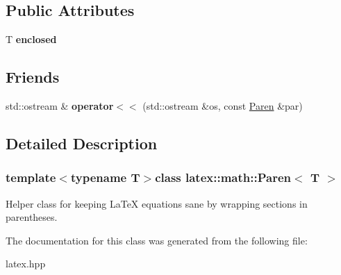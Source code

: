 \subsection*{\-Public \-Attributes}
\begin{DoxyCompactItemize}
\item 
\hypertarget{classlatex_1_1math_1_1Paren_a629cccc17db6e7e25e4d57ccabc5320a}{\-T {\bfseries enclosed}}\label{classlatex_1_1math_1_1Paren_a629cccc17db6e7e25e4d57ccabc5320a}

\end{DoxyCompactItemize}
\subsection*{\-Friends}
\begin{DoxyCompactItemize}
\item 
\hypertarget{classlatex_1_1math_1_1Paren_afcb1b94ae8023cf02d56f708ee5d25ea}{std\-::ostream \& {\bfseries operator$<$$<$} (std\-::ostream \&os, const \hyperlink{classlatex_1_1math_1_1Paren}{\-Paren} \&par)}\label{classlatex_1_1math_1_1Paren_afcb1b94ae8023cf02d56f708ee5d25ea}

\end{DoxyCompactItemize}


\subsection{\-Detailed \-Description}
\subsubsection*{template$<$typename T$>$class latex\-::math\-::\-Paren$<$ T $>$}

\-Helper class for keeping \-La\-Te\-X equations sane by wrapping sections in parentheses. 

\-The documentation for this class was generated from the following file\-:\begin{DoxyCompactItemize}
\item 
latex.\-hpp\end{DoxyCompactItemize}
